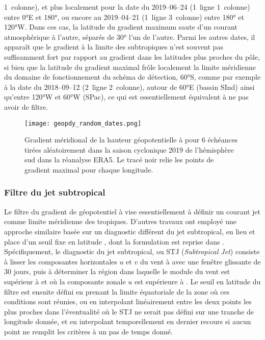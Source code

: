 \documentclass[../main.tex]{subfiles}
\begin{document}
1\iere~colonne), et plus localement pour la date du 2019--06--24 (1\iere~ligne 1\iere~colonne) entre \ang{0}E et \ang{180}, ou encore au 2019--04--21
(1\iere~ligne 3\ieme~colonne) entre \ang{180} et \ang{120}W. Dans ces cas, la latitude du gradient maximum saute d'un courant atmosphérique à l'autre, séparés
de \ang{30} l'un de l'autre. Parmi les autres dates, il apparaît que le gradient à la limite des subtropiques n'est souvent pas suffisamment fort par rapport au
gradient dans les latitudes plus proches du pôle, si bien que la latitude du gradient maximal frôle localement la limite méridienne du domaine de
fonctionnement du schéma de détection, \ang{60}S, comme par exemple à la date du 2018--09--12 (2\ieme~ligne 2\ieme~colonne), autour de \ang{60}E (bassin SInd)
ainsi qu'entre \ang{120}W et \ang{60}W (SPac), ce qui est essentiellement équivalent à ne pas avoir de filtre.
%
\begin{figure}[tb]
    \centering
    \texttt{[image: geopdy\_random\_dates.png]}
    \caption{Gradient méridional de la hauteur géopotentielle à  pour 6 échéances tirées aléatoirement dans la saison cyclonique 2019 de l'hémisphère
    sud dans la réanalyse ERA5. Le tracé noir relie les points de gradient maximal pour chaque longitude.}
    \label{fig:geopdy_random}
\end{figure}

\subsubsection*{Filtre du jet subtropical}

Le filtre du gradient de géopotentiel à  vise essentiellement à définir un courant jet comme limite méridienne des tropiques. D'autres travaux ont
employé une approche similaire basée sur un diagnostic différent du jet subtropical, en lieu et place d'un seuil fixe en latitude
\parencite{tory_projected_2013,tory_sea_2015,bell_statistical_2018}, dont la formulation est reprise dans \textcite{bourdin_intercomparison_2022}.
Spécifiquement, le diagnostic du jet subtropical, ou STJ (\textit{Subtropical Jet}) consiste à lisser les composantes horizontales $u$ et $v$ du vent à
 avec une fenêtre glissante de 30 jours, puis à déterminer la région dans laquelle le module du vent est supérieur à  et où la composante zonale
$u$ est supérieure à . Le seuil en latitude du filtre est ensuite défini en prenant la limite équatoriale de la zone où ces conditions sont réunies, ou
en interpolant linéairement entre les deux points les plus proches dans l'éventualité où le STJ ne serait pas défini sur une tranche de longitude donnée, et en
interpolant temporellement en dernier recours si aucun point ne remplit les critères à un pas de temps donné. 
\end{document}
